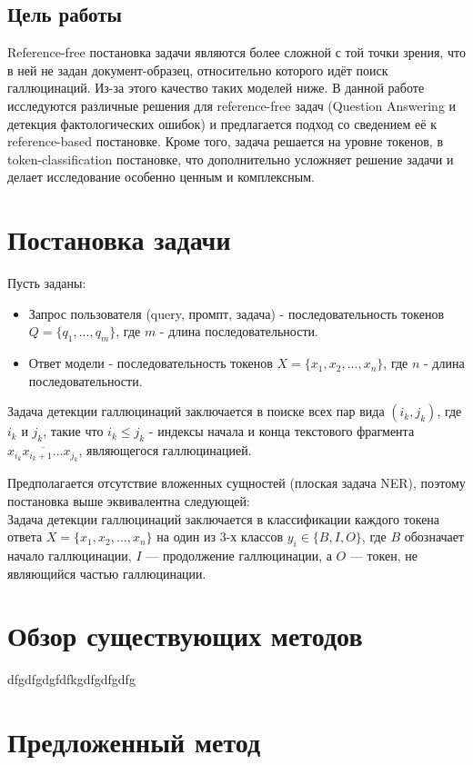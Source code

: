 \documentclass[12pt]{article}
\begin{document}
\subsection{Цель работы}
Reference-free постановка задачи являются более сложной с той точки зрения, что в ней не задан документ-образец, относительно которого идёт поиск галлюцинаций. Из-за этого качество таких моделей ниже. В данной работе исследуются различные решения для reference-free задач (Question Answering и детекция фактологических ошибок) и предлагается подход со сведением её к reference-based постановке. Кроме того, задача решается на уровне токенов, в token-classification постановке, что дополнительно усложняет решение задачи и делает исследование особенно ценным и комплексным.

\clearpage
\section{Постановка задачи}

Пусть заданы:
\begin{itemize}
    \item Запрос пользователя (query, промпт, задача) - последовательность токенов $Q = \{q_1,...,q_m\}$, где $m$ - длина последовательности.
    \item Ответ модели - последовательность токенов $X = \{x_1, x_2, . . . , x_n\}$, где $n$ - длина последовательности.
\end{itemize} 
Задача детекции галлюцинаций заключается в поиске всех пар вида $(i_k , j_k)$, где $i_k$ и $j_k$, такие что $i_k \leqslant j_k$ - индексы начала и конца текстового фрагмента $\overline{x_{i_k}x_{i_k+1}...x_{j_k}}$, являющегося галлюцинацией.

Предполагается отсутствие вложенных сущностей (плоская задача NER), поэтому постановка выше эквивалентна следующей: 
\\
Задача детекции галлюцинаций заключается в классификации каждого токена ответа \( X = \{x_1, x_2, \ldots, x_n\} \) на один из 3-х классов \( y_i \in \{B, I, O\} \), где \( B \) обозначает начало галлюцинации, \( I \) — продолжение галлюцинации, а \( O \) — токен, не являющийся частью галлюцинации.


\section{Обзор существующих методов}
dfgdfgdgfd\cite{abaho2021detect}fkgdfgdfgdfg
\cite{baly2020we}
\clearpage
\section{Предложенный метод}
\end{document}
